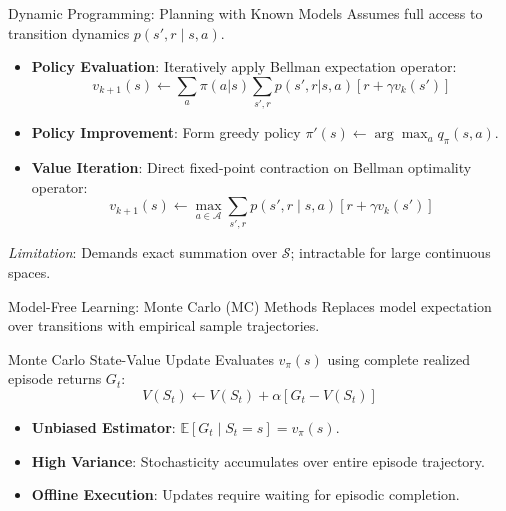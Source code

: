 \documentclass[10pt, aspectratio=169]{beamer}
\begin{document}
\begin{frame}{Dynamic Programming: Planning with Known Models}
  Assumes full access to transition dynamics $p(s', r \mid s, a)$.

  \begin{itemize}
    \item \textbf{Policy Evaluation}: Iteratively apply Bellman expectation operator:
      $$v_{k+1}(s) \leftarrow \sum_a \pi(a|s) \sum_{s',r} p(s',r|s,a)[r + \gamma v_k(s')]$$
    \item \textbf{Policy Improvement}: Form greedy policy $\pi'(s) \leftarrow \arg\max_a q_{\pi}(s,a)$.
    \item \textbf{Value Iteration}: Direct fixed-point contraction on Bellman optimality operator:
      $$v_{k+1}(s) \leftarrow \max_{a \in \mathcal{A}} \sum_{s', r} p(s', r \mid s, a) [r + \gamma v_k(s')]$$
  \end{itemize}
  \textit{Limitation}: Demands exact summation over $\mathcal{S}$; intractable for large continuous spaces.
\end{frame}

\begin{frame}{Model-Free Learning: Monte Carlo (MC) Methods}
  Replaces model expectation over transitions with empirical sample trajectories.

  \begin{block}{Monte Carlo State-Value Update}
    Evaluates $v_\pi(s)$ using complete realized episode returns $G_t$:
    $$V(S_t) \leftarrow V(S_t) + \alpha \left[ G_t - V(S_t) \right]$$
  \end{block}

  \begin{itemize}
    \item \textbf{Unbiased Estimator}: $\mathbb{E}[G_t \mid S_t = s] = v_\pi(s)$.
    \item \textbf{High Variance}: Stochasticity accumulates over entire episode trajectory.
    \item \textbf{Offline Execution}: Updates require waiting for episodic completion.
  \end{itemize}
\end{frame}
\end{document}
